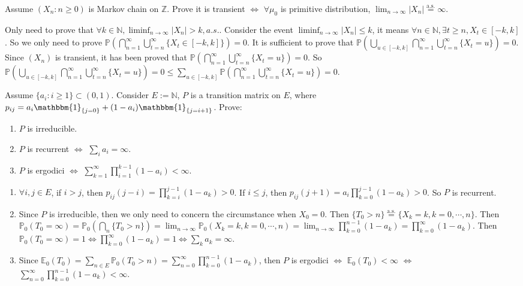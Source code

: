 \documentclass{ctexart}
\begin{document}
\begin{problem}\label{pro:4}
  Assume \((X_n:n \geq 0)\) is Markov chain on \(\mathbb{Z}\). Prove it is transient \(\iff\)
  \(\forall \mu_0\) is primitive distribution, \(\lim_{n \to \infty} |X_n| \overset{\text{a.s.}}{=} \infty\).
\end{problem}
\begin{solution}
  Only need to prove that \(\forall k \in \mathbb{N},\liminf_{n \to \infty}|X_n|>k,a. s.\).
  Consider the event \(\liminf_{n \to \infty}|X_n|\leq k\), it means \(\forall n \in \mathbb{N},\exists t \geq n,X_t \in [-k,k]\).
  So we only need to prove \(\mathbb{P}\left(\bigcap_{n=1}^{\infty} \bigcup_{t=n}^{\infty} \{X_t \in [-k,k]\}\right)=0\).
  It is sufficient to prove that \(\mathbb{P}(\bigcup_{u \in [-k,k]}\bigcap_{n=1}^{\infty} \bigcup_{t=n}^{\infty} \{X_t=u\})=0\).
  Since \((X_n)\) is transient, it has been proved that \(\mathbb{P}(\bigcap_{n=1}^{\infty} \bigcup_{t=n}^{\infty} \{X_t=u\})=0\).
  So \(\mathbb{P}(\bigcup_{u \in [-k,k]}\bigcap_{n=1}^{\infty} \bigcup_{t=n}^{\infty} \{X_t=u\})=0 \leq \sum_{u \in [-k,k]}\mathbb{P}(\bigcap_{n=1}^{\infty} \bigcup_{t=n}^{\infty} \{X_t=u\})=0\).
\end{solution}
\begin{problem}\label{pro:5}
  Assume \(\{a_i: i \geq 1\} \subset (0,1)\). Consider \(E:=\mathbb{N}\), \(P\) is a transition matrix on \(E\),
  where \(p_{ij}=a_i \mathbbm{1}_{\{j=0\}} + (1-a_i)\mathbbm{1}_{\{j=i+1\}}\).
  Prove:
  \begin{enumerate}
    \item \(P\) is irreducible.
    \item \(P\) is recurrent \( \iff \) \(\sum_{i}a_i=\infty\).
    \item \(P\) is ergodici \(\iff \) \(\sum_{k=1}^{\infty} \prod_{i=1}^{k-1} (1-a_i)< \infty\).
  \end{enumerate}
\end{problem}
\begin{solution}
  \begin{enumerate}
    \item \(\forall i, j \in E\), if \(i > j\), then \(p_{ij}(j-i)=\prod_{k=i}^{j-1}(1-a_k)>0\). If \(i \leq j\), then \(p_{ij}(j + 1)=a_i \prod_{k=0}^{j-1} (1-a_k)>0\).
      So \(P\) is recurrent.
    \item Since \(P\) is irreducible, then we only need to concern the circumstance when \(X_0=0\). Then \(\{T_0 > n\} \overset{\text{a.s.}}{=}\{X_k=k,k=0,\cdots,n\}\).
      Then \(\mathbb{P}_0(T_0 = \infty)=\mathbb{P}_0(\bigcap_{n}\{T_0 > n\})=\lim_{n \to \infty}\mathbb{P}_0(X_k=k,k=0,\cdots,n)=\lim_{n \to \infty}\prod_{k=0}^{n-1} (1-a_k) =\prod_{k=0}^{\infty} (1-a_k) \).
      Then \(\mathbb{P}_0(T_0=\infty)=1 \iff \prod_{k=0}^{\infty} (1-a_k) =1\iff \sum_{k}a_k=\infty\).
    \item Since \(\mathbb{E}_0(T_0)=\sum_{n \in E}\mathbb{P}_0(T_0 >n)=\sum_{n=0}^{\infty} \prod_{k=0}^{n-1} (1-a_k)\), then \(P\) is ergodici
      \(\iff \) \(\mathbb{E}_0(T_0) < \infty\) \(\iff\) \(\sum_{n=0}^{\infty} \prod_{k=0}^{n-1} (1-a_k) <\infty\).
  \end{enumerate}
\end{solution}
\end{document}
